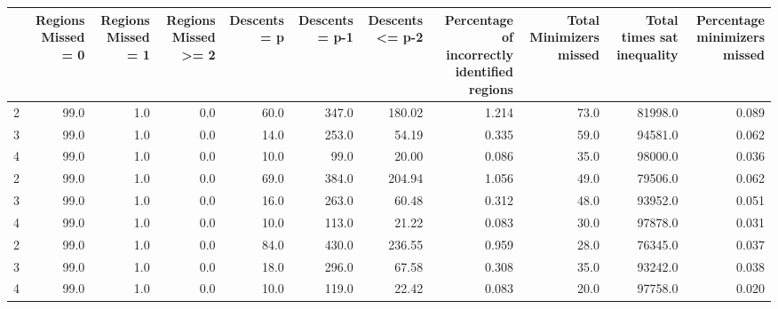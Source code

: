 \begin{tabular}{lrrrrrrrrrr}
\toprule
{} &  Regions Missed = 0 &  Regions Missed = 1 &  Regions Missed >= 2 &  Descents = p &  Descents = p-1 &  Descents <= p-2 &  Percentage of incorrectly identified regions &  Total Minimizers missed &  Total times sat inequality &  Percentage minimizers missed \\
\midrule
2 &                99.0 &                 1.0 &                  0.0 &          60.0 &           347.0 &           180.02 &                                         1.214 &                     73.0 &                     81998.0 &                         0.089 \\
3 &                99.0 &                 1.0 &                  0.0 &          14.0 &           253.0 &            54.19 &                                         0.335 &                     59.0 &                     94581.0 &                         0.062 \\
4 &                99.0 &                 1.0 &                  0.0 &          10.0 &            99.0 &            20.00 &                                         0.086 &                     35.0 &                     98000.0 &                         0.036 \\
2 &                99.0 &                 1.0 &                  0.0 &          69.0 &           384.0 &           204.94 &                                         1.056 &                     49.0 &                     79506.0 &                         0.062 \\
3 &                99.0 &                 1.0 &                  0.0 &          16.0 &           263.0 &            60.48 &                                         0.312 &                     48.0 &                     93952.0 &                         0.051 \\
4 &                99.0 &                 1.0 &                  0.0 &          10.0 &           113.0 &            21.22 &                                         0.083 &                     30.0 &                     97878.0 &                         0.031 \\
2 &                99.0 &                 1.0 &                  0.0 &          84.0 &           430.0 &           236.55 &                                         0.959 &                     28.0 &                     76345.0 &                         0.037 \\
3 &                99.0 &                 1.0 &                  0.0 &          18.0 &           296.0 &            67.58 &                                         0.308 &                     35.0 &                     93242.0 &                         0.038 \\
4 &                99.0 &                 1.0 &                  0.0 &          10.0 &           119.0 &            22.42 &                                         0.083 &                     20.0 &                     97758.0 &                         0.020 \\
\bottomrule
\end{tabular}
